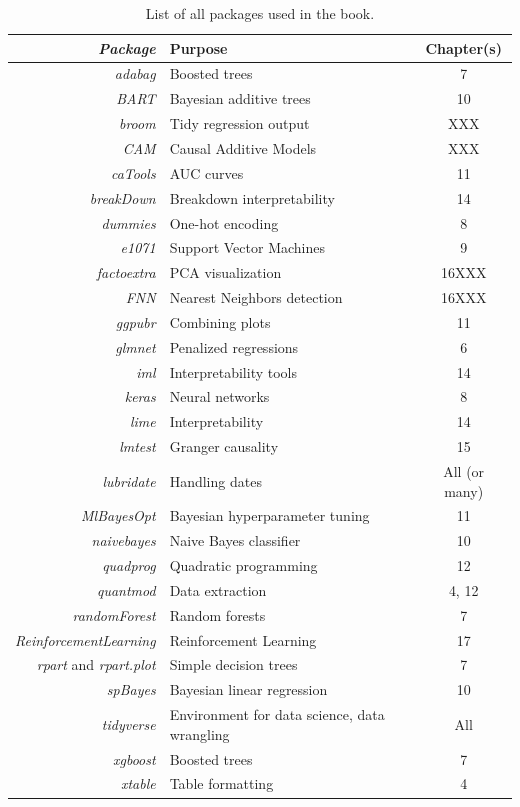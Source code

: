 \documentclass[]{krantz}
\theoremstyle{definition}
\theoremstyle{definition}
\theoremstyle{definition}
\theoremstyle{remark}
\begin{document}
\begin{table}
\begin{center}
\begin{tabular}{rlc}
\textit{Package} & Purpose & Chapter(s) \\ \hline
\textit{adabag} & Boosted trees & 7 \\
\textit{BART} & Bayesian additive trees &  10\\
\textit{broom} & Tidy regression output & XXX \\
\textit{CAM} & Causal Additive Models & XXX \\
\textit{caTools} & AUC curves & 11 \\
\textit{breakDown} & Breakdown interpretability & 14 \\
\textit{dummies} & One-hot encoding & 8 \\
\textit{e1071} & Support Vector Machines & 9 \\
\textit{factoextra} &  PCA visualization & 16XXX \\
\textit{FNN} & Nearest Neighbors detection & 16XXX \\
\textit{ggpubr} & Combining plots & 11  \\
\textit{glmnet} & Penalized regressions & 6 \\
\textit{iml} & Interpretability tools & 14 \\
\textit{keras} & Neural networks  & 8 \\
\textit{lime} & Interpretability & 14 \\
\textit{lmtest} & Granger causality & 15 \\
\textit{lubridate} & Handling dates & All (or many) \\
\textit{MlBayesOpt} & Bayesian hyperparameter tuning & 11 \\
\textit{naivebayes} & Naive Bayes classifier & 10 \\
\textit{quadprog} & Quadratic programming & 12 \\
\textit{quantmod} & Data extraction & 4, 12\\
\textit{randomForest} & Random forests & 7 \\
\textit{ReinforcementLearning} & Reinforcement Learning & 17 \\
\textit{rpart} and \textit{rpart.plot} & Simple decision trees &7 \\
\textit{spBayes} & Bayesian linear regression & 10 \\
\textit{tidyverse} & Environment for data science, data wrangling & All \\
\textit{xgboost} & Boosted trees  & 7 \\
\textit{xtable} & Table formatting & 4 \\ \hline
\end{tabular}
\end{center}
\caption{List of all packages used in the book. \label{tab:packages}}
\end{table}
\end{document}
